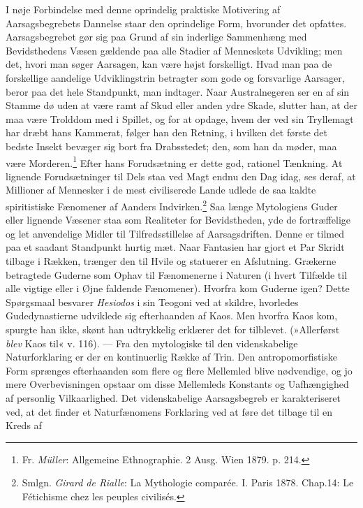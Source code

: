 \documentclass[12pt,a4paper,openany]{book}
\newcommand{\opage}[1]{\marginnote{\footnotesize\textit{[#1]}}}
\begin{document}
I nøje Forbindelse med denne oprindelig praktiske Motivering af
Aarsagsbegrebets Dannelse staar den oprindelige Form, hvorunder det
opfattes. Aarsagsbegrebet gør sig paa Grund af sin inderlige Sammenhæng
med Bevidsthedens Væsen gældende paa alle Stadier af Menneskets
Udvikling; men det,
\opage{262}hvori man søger Aarsagen, kan være højst forskelligt. Hvad
man paa de forskellige aandelige Udviklingstrin betragter som gode og
forsvarlige Aarsager, beror paa det hele Standpunkt, man indtager. Naar
Australnegeren ser en af sin Stamme dø uden at være ramt af Skud eller
anden ydre Skade, slutter han, at der maa være Trolddom med i Spillet,
og for at opdage, hvem der ved sin Tryllemagt har dræbt hans Kammerat,
følger han den Retning, i hvilken det første det bedste Insekt bevæger
sig bort fra Drabsstedet; den, som han da møder, maa være
Morderen.\footnote[1]{Fr. \emph{Müller}: Allgemeine Ethnographie. 2 Ausg. Wien 1879. p. 214.} Efter hans Forudsætning er dette god, rationel Tænkning.
At lignende Forudsætninger til Dels staa ved Magt endnu den Dag idag,
ses deraf, at Millioner af Mennesker i de mest civiliserede Lande udlede
de saa kaldte spiritistiske Fænomener af Aanders
Indvirken.\footnote[2]{Smlgn. \emph{Girard de Rialle}: La Mythologie
comparée. I. Paris 1878. Chap.14: Le Fétichisme chez les peuples
civilisés.} Saa længe Mytologiens Guder eller lignende Væsener staa som
Realiteter for Bevidstheden, yde de fortræffelige og let anvendelige
Midler til Tilfredsstillelse af Aarsagsdriften. Denne er tilmed paa et
saadant Standpunkt hurtig mæt. Naar Fantasien har gjort et Par Skridt
tilbage i Rækken, trænger den til Hvile og statuerer en Afslutning.
Grækerne betragtede Guderne som Ophav til Fænomenerne i Naturen (i hvert
Tilfælde til alle vigtige eller i Øjne faldende Fænomener). Hvorfra kom
Guderne igen? Dette Spørgsmaal besvarer \emph{Hesiodos} i sin Teogoni
ved at skildre, hvorledes Gudedynastierne udviklede sig efterhaanden af
Kaos. Men hvorfra Kaos kom, spurgte han ikke, skønt han udtrykkelig
erklærer det for tilblevet. (»Allerførst \emph{blev} Kaos til« v. 116).
--- Fra den mytologiske til den videnskabelige Naturforklaring er der en
kontinuerlig Række af Trin. Den antropomorfistiske Form sprænges
efterhaanden som flere og flere Mellemled blive nødvendige, og jo mere
Overbevisningen opstaar om disse Mellemleds Konstants og Uafhængighed af
personlig Vilkaarlighed. Det videnskabelige Aarsagsbegreb er
karakteriseret ved, at det finder et Naturfænomens Forklaring ved at
føre det tilbage til en Kreds af
\end{document}
